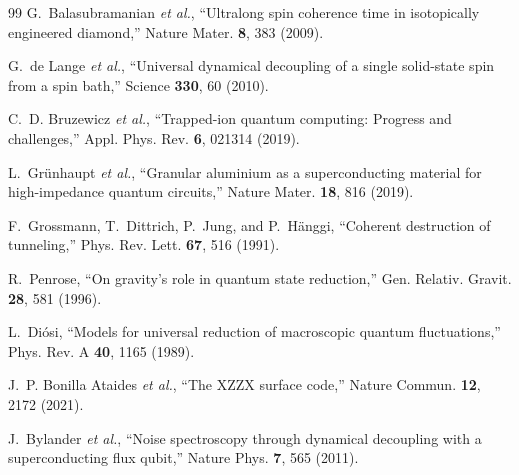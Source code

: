 \documentclass[aps,prl,twocolumn,superscriptaddress,nofootinbib,longbibliography]{revtex4-2}
\begin{document}
\begin{thebibliography}{99}
G.~Balasubramanian \textit{et al.}, ``Ultralong spin coherence time in
isotopically engineered diamond,'' Nature Mater. \textbf{8}, 383 (2009).

G.~de Lange \textit{et al.}, ``Universal dynamical decoupling of a
single solid-state spin from a spin bath,'' Science \textbf{330}, 60
(2010).

C.~D. Bruzewicz \textit{et al.}, ``Trapped-ion quantum computing:
Progress and challenges,'' Appl. Phys. Rev. \textbf{6}, 021314 (2019).

L.~Gr\"unhaupt \textit{et al.}, ``Granular aluminium as a
superconducting material for high-impedance quantum circuits,'' Nature
Mater. \textbf{18}, 816 (2019).

F.~Grossmann, T.~Dittrich, P.~Jung, and P.~H\"anggi, ``Coherent
destruction of tunneling,'' Phys. Rev. Lett. \textbf{67}, 516 (1991).

R.~Penrose, ``On gravity's role in quantum state reduction,'' Gen.
Relativ. Gravit. \textbf{28}, 581 (1996).

L.~Di\'osi, ``Models for universal reduction of macroscopic quantum
fluctuations,'' Phys. Rev. A \textbf{40}, 1165 (1989).

J.~P. Bonilla Ataides \textit{et al.}, ``The XZZX surface code,''
Nature Commun. \textbf{12}, 2172 (2021).

J.~Bylander \textit{et al.}, ``Noise spectroscopy through dynamical
decoupling with a superconducting flux qubit,'' Nature Phys. \textbf{7},
565 (2011).

\end{thebibliography}
\end{document}
